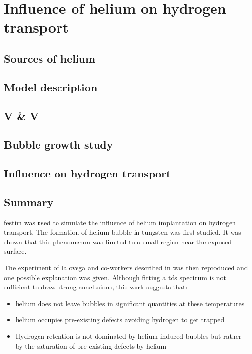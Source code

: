 \setchapterpreamble[u]{\margintoc}
\chapter{Influence of helium on hydrogen transport}
\label{Chapter5} %



\section{Sources of helium}


\section{Model description}


\section{V \& V}


\section{Bubble growth study}


\section{Influence on hydrogen transport}


\section{Summary}

\gls{festim} was used to simulate the influence of helium implantation on hydrogen transport.
The formation of helium bubble in tungsten was first studied.
It was shown that this phenomenon was limited to a small region near the exposed surface.

The experiment of Ialovega and co-workers described in  was then reproduced and one possible explanation was given.
Although fitting a \gls{tds} spectrum is not sufficient to draw strong conclusions, this work suggests that:
\begin{itemize}
    \item helium does not leave bubbles in significant quantities at these temperatures
    \item helium occupies pre-existing defects avoiding hydrogen to get trapped
    \item Hydrogen retention is not dominated by helium-induced bubbles but rather by the saturation of pre-existing defects by helium
\end{itemize}

